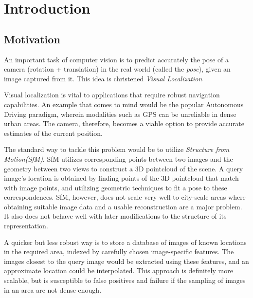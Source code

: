 

\chapter{Introduction}
\section{Motivation}
An important task of computer vision is to predict accurately the pose of a camera (rotation + translation) in the real world (called the \emph{pose}), given an image captured from it. This idea is christened \emph{Visual Localization} 

Visual localization is vital to applications that require robust navigation capabilities. An example that comes to mind would be the popular Autonomous Driving paradigm, wherein modalities such as GPS can be unreliable in dense urban areas. The camera, therefore, becomes a viable option to provide accurate estimates of the current position. 

The standard way to tackle this problem would be to utilize \emph{Structure from Motion(SfM)}. SfM utilizes corresponding points between two images and the geometry between two views to construct a 3D pointcloud of the scene. A query image's location is obtained by finding points of the 3D pointcloud that match with image points, and utilizing geometric techniques to fit a pose to these correspondences. SfM, however, does not scale very well to city-scale areas where obtaining suitable image data and a usable reconstruction are a major problem. It also does not behave well with later modifications to the structure of its representation.

A quicker but less robust way is to store a database of images of known locations in the required area, indexed by carefully chosen image-specific features. The images closest to the query image would be extracted using these features, and an approximate location could be interpolated. This approach is definitely more scalable, but is susceptible to false positives and failure if the sampling of images in an area are not dense enough. 

